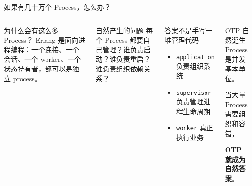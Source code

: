 \documentclass[aspectratio=169, 9pt]{beamer}
\newcommand{\good}[1]{\textbf{\color{accent!80!black}#1}}
\newcommand{\code}[1]{\texttt{#1}}
\begin{document}
\begin{frame}{如果有几十万个 Process，怎么办？}
  \begin{columns}[T,onlytextwidth]
    \begin{alertblock}{为什么会有这么多 Process？}
      Erlang 是面向进程编程：一个连接、一个会话、一个 worker、一个状态持有者，都可以是独立 process。
    \end{alertblock}
    \begin{alertblock}{自然产生的问题}
      每个 Process 都要自己管理？谁负责启动？谁负责重启？谁负责组织依赖关系？
    \end{alertblock}
    \begin{block}{答案不是手写一堆管理代码}
      \begin{itemize}
        \item \code{application} 负责组织系统
        \item \code{supervisor} 负责管理进程生命周期
        \item \code{worker} 真正执行业务
      \end{itemize}
    \end{block}
    \begin{exampleblock}{OTP 自然诞生}
      \centering
      \Large
      Process 是并发基本单位。\par
      当大量 Process 需要组织和容错，\par
      \good{OTP 就成为自然答案}。
    \end{exampleblock}
  \end{columns}
\end{frame}
\end{document}
